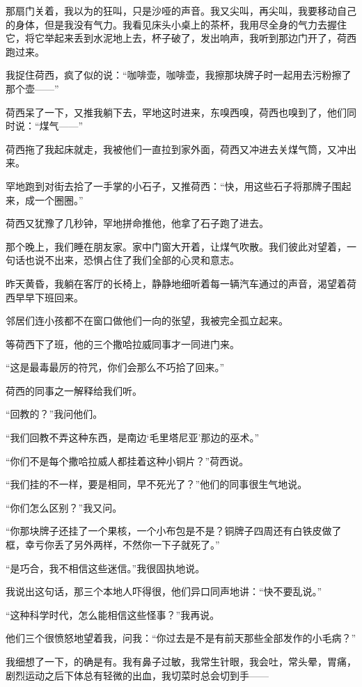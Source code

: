 \par 那扇门关着，我以为的狂叫，只是沙哑的声音。我又尖叫，再尖叫，我要移动自己的身体，但是我没有气力。我看见床头小桌上的茶杯，我用尽全身的气力去握住它，将它举起来丢到水泥地上去，杯子破了，发出响声，我听到那边门开了，荷西跑过来。
\par 我捉住荷西，疯了似的说：“咖啡壶，咖啡壶，我擦那块牌子时一起用去污粉擦了那个壶——”
\par 荷西呆了一下，又推我躺下去，罕地这时进来，东嗅西嗅，荷西也嗅到了，他们同时说：“煤气——”
\par 荷西拖了我起床就走，我被他们一直拉到家外面，荷西又冲进去关煤气筒，又冲出来。
\par 罕地跑到对街去拾了一手掌的小石子，又推荷西：“快，用这些石子将那牌子围起来，成一个圈圈。”
\par 荷西又犹豫了几秒钟，罕地拼命推他，他拿了石子跑了进去。
\par 那个晚上，我们睡在朋友家。家中门窗大开着，让煤气吹散。我们彼此对望着，一句话也说不出来，恐惧占住了我们全部的心灵和意志。
\par 昨天黄昏，我躺在客厅的长椅上，静静地细听着每一辆汽车通过的声音，渴望着荷西早早下班回来。
\par 邻居们连小孩都不在窗口做他们一向的张望，我被完全孤立起来。
\par 等荷西下了班，他的三个撒哈拉威同事才一同进门来。
\par “这是最毒最厉的符咒，你们会那么不巧拾了回来。”
\par 荷西的同事之一解释给我们听。
\par “回教的？”我问他们。
\par “我们回教不弄这种东西，是南边‘毛里塔尼亚’那边的巫术。”
\par “你们不是每个撒哈拉威人都挂着这种小铜片？”荷西说。
\par “我们挂的不一样，要是相同，早不死光了？”他们的同事很生气地说。
\par “你们怎么区别？”我又问。
\par “你那块牌子还挂了一个果核，一个小布包是不是？铜牌子四周还有白铁皮做了框，幸亏你丢了另外两样，不然你一下子就死了。”
\par “是巧合，我不相信这些迷信。”我很固执地说。
\par 我说出这句话，那三个本地人吓得很，他们异口同声地讲：“快不要乱说。”
\par “这种科学时代，怎么能相信这些怪事？”我再说。
\par 他们三个很愤怒地望着我，问我：“你过去是不是有前天那些全部发作的小毛病？”
\par 我细想了一下，的确是有。我有鼻子过敏，我常生针眼，我会吐，常头晕，胃痛，剧烈运动之后下体总有轻微的出血，我切菜时总会切到手——
